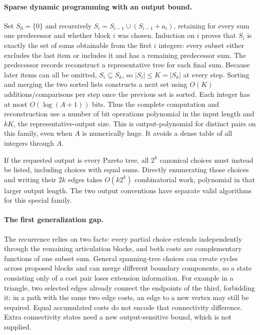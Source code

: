 \documentclass[11pt]{article}
\begin{document}
\paragraph{Sparse dynamic programming with an output bound.}
Set $S_0=\{0\}$ and recursively
$S_i=S_{i-1}\cup(S_{i-1}+a_i)$, retaining for every sum
one predecessor and whether block $i$ was chosen. Induction on
$i$ proves that $S_i$ is exactly the set of sums obtainable
from the first $i$ integers: every subset either excludes the
last item or includes it and has a remaining predecessor sum.
The predecessor records reconstruct a representative tree for each
final sum. Because later items can all be omitted,
$S_i\subseteq S_k$, so $|S_i|\le K=|S_k|$ at every step.
Sorting and merging the two sorted lists constructs a next set
using $O(K)$ additions/comparisons per step once the previous
set is sorted. Each integer has at most $O(\log(A+1))$
bits. Thus the complete computation and reconstruction use a number
of bit operations polynomial in the input length and $kK$,
the representative-output size. This is output-polynomial for
distinct pairs on this family, even when $A$ is numerically huge.
It avoids a dense table of all integers through $A$.

If the requested output is every Pareto tree, all $2^k$
canonical choices must instead be listed, including choices with
equal sums. Directly enumerating those choices and writing their
$2k$ edges takes $O(k2^k)$ combinatorial work, polynomial
in that larger output length. The two output conventions have
separate valid algorithms for this special family.

\paragraph{The first generalization gap.}
The recurrence relies on two facts: every partial choice extends
independently through the remaining articulation blocks, and both
costs are complementary functions of one subset sum. General
spanning-tree choices can create cycles across proposed blocks and
can merge different boundary components, so a state consisting only
of a cost pair loses extension information. For example in a
triangle, two selected edges already connect the endpoints of the
third, forbidding it; in a path with the same two edge costs,
an edge to a new vertex may still be required. Equal accumulated
costs do not encode that connectivity difference. Extra connectivity
states need a new output-sensitive bound, which is not supplied.
\end{document}
